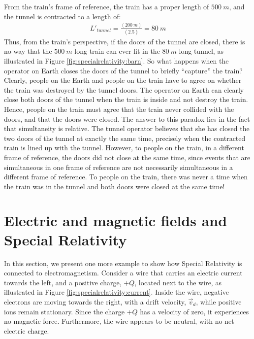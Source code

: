 From the train's frame of reference, the train has a proper length of $\SI{500}{m}$, and the tunnel is contracted to a length of:
\begin{align*}
L'_{tunnel}=\frac{(\SI{200}{m})}{(2.5)}=\SI{80}{m}
\end{align*}
Thus, from the train's perspective, if the doors of the tunnel are closed, there is no way that the $\SI{500}{m}$ long train can ever fit in the $\SI{80}{m}$ long tunnel, as illustrated in Figure \ref{fig:specialrelativity:barn}. So what happens when the operator on Earth closes the doors of the tunnel to briefly ``capture'' the train? 
Clearly, people on the Earth and people on the train have to agree on whether the train was destroyed by the tunnel doors. The operator on Earth can clearly close both doors of the tunnel when the train is inside and not destroy the train. Hence, people on the train must agree that the train never collided with the doors, and that the doors were closed. The answer to this paradox lies in the fact that simultaneity is relative. The tunnel operator believes that she has closed the two doors of the tunnel at exactly the same time, precisely when the contracted train is lined up with the tunnel. However, to people on the train, in a different frame of reference, the doors did not close at the same time, since events that are simultaneous in one frame of reference are not necessarily simultaneous in a different frame of reference. To people on the train, there was never a time when the train was in the tunnel and both doors were closed at the same time!
\section{Electric and magnetic fields and Special Relativity}
In this section, we present one more example to show how Special Relativity is connected to electromagnetism. Consider a wire that carries an electric current towards the left, and a positive charge, $+Q$, located next to the wire, as illustrated in Figure \ref{fig:specialrelativity:current}.
Inside the wire, negative electrons are moving towards the right, with a drift velocity, $\vec v_d$, while positive ions remain stationary. Since the charge $+Q$ has a velocity of zero, it experiences no magnetic force. Furthermore, the wire appears to be neutral, with no net electric charge.

